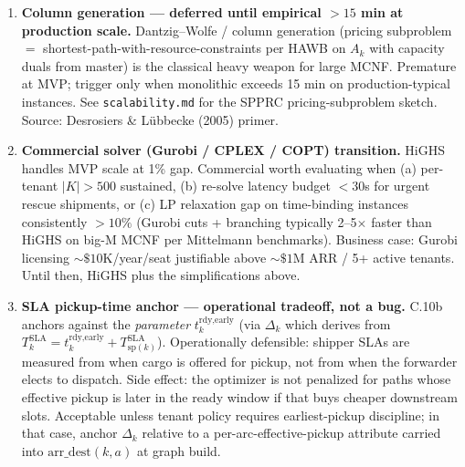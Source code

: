 \documentclass[11pt,a4paper]{article}
\theoremstyle{definition}
\begin{document}
\begin{enumerate}[resume]
  \item \label{item:strat-column-generation} \textbf{Column generation ---
        deferred until empirical $> 15$ min at production scale.}
        Dantzig--Wolfe / column generation (pricing subproblem $=$
        shortest-path-with-resource-constraints per HAWB on $A_k$ with
        capacity duals from master) is the classical heavy weapon for large
        MCNF. Premature at MVP; trigger only when monolithic exceeds 15 min
        on production-typical instances. See \texttt{scalability.md} for
        the SPPRC pricing-subproblem sketch. Source: Desrosiers \& Lübbecke
        (2005) primer.
  \item \label{item:strat-commercial-solver} \textbf{Commercial solver
        (Gurobi / CPLEX / COPT) transition.} HiGHS handles MVP scale at 1\%
        gap. Commercial worth evaluating when (a) per-tenant $|K| > 500$
        sustained, (b) re-solve latency budget $< 30$s for urgent rescue
        shipments, or (c) LP relaxation gap on time-binding instances
        consistently $> 10\%$ (Gurobi cuts + branching typically
        2--5$\times$ faster than HiGHS on big-M MCNF per Mittelmann
        benchmarks). Business case: Gurobi licensing $\sim \$10$K/year/seat
        justifiable above $\sim \$1$M ARR / 5+ active tenants. Until then,
        HiGHS plus the simplifications above.
  \item \label{item:strat-sla-pickup-anchor} \textbf{SLA pickup-time anchor
        --- operational tradeoff, not a bug.} C.10b anchors against the
        \emph{parameter} $t_k^{\text{rdy,early}}$ (via $\Delta_k$ which
        derives from $T_k^{\text{SLA}} = t_k^{\text{rdy,early}} +
        T^{\text{SLA}}_{\text{sp}(k)}$). Operationally defensible: shipper
        SLAs are measured from when cargo is offered for pickup, not from
        when the forwarder elects to dispatch. Side effect: the optimizer
        is not penalized for paths whose effective pickup is later in the
        ready window if that buys cheaper downstream slots. Acceptable
        unless tenant policy requires earliest-pickup discipline; in that
        case, anchor $\Delta_k$ relative to a per-arc-effective-pickup
        attribute carried into $\text{arr\_dest}(k, a)$ at graph build.
\end{enumerate}
\end{document}

